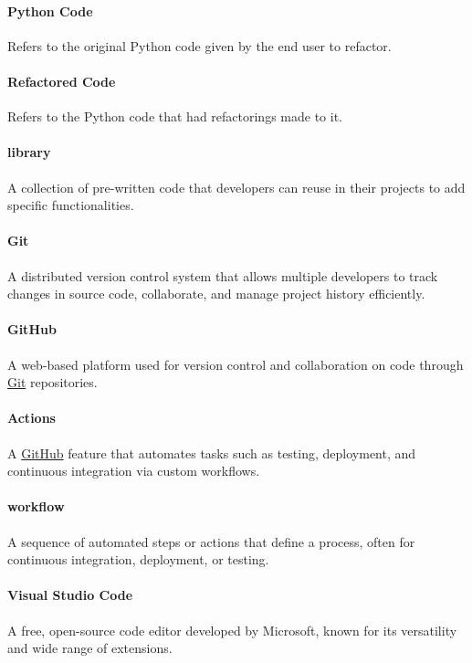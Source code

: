 \documentclass[12pt]{article}
\begin{document}
\paragraph*{Python Code}
Refers to the original Python code given by the end user to refactor.

\paragraph*{Refactored Code}
Refers to the Python code that had refactorings made to it.

\paragraph*{library}
A collection of pre-written code that developers can reuse in their projects to add specific functionalities.

\paragraph*{Git}
\label{term:git}
A distributed version control system that allows multiple developers to track changes in source code, collaborate, and manage project history efficiently.

\paragraph*{GitHub}
\label{term:GitH}
A web-based platform used for version control and collaboration on code through \hyperref[term:git]{Git} repositories.

\paragraph*{Actions}
A \hyperref[term:GitH]{GitHub} feature that automates tasks such as testing, deployment, and continuous integration via custom workflows.

\paragraph*{workflow}
A sequence of automated steps or actions that define a process, often for continuous integration, deployment, or testing.

\paragraph*{Visual Studio Code}
\label{term:VSC}
A free, open-source code editor developed by Microsoft, known for its versatility and wide range of extensions.
\end{document}
